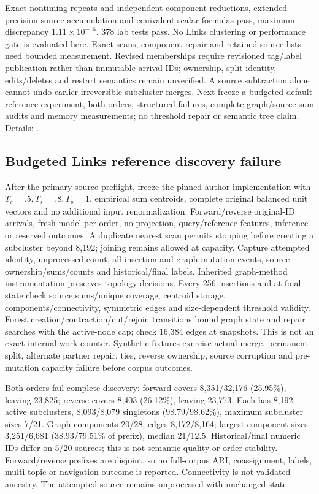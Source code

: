 \documentclass[11pt]{article}
\begin{document}
Exact nontiming repeats and independent component reductions, extended-precision
source accumulation and equivalent scalar formulas pass, maximum discrepancy
$1.11\times10^{-16}$. 378 lab tests pass. No Links clustering or performance
gate is evaluated here. Exact scans, component repair and retained source lists
need bounded measurement. Revised memberships require revisioned tag/label
publication rather than immutable arrival IDs; ownership, split identity,
edits/deletes and restart semantics remain unverified. A source subtraction alone
cannot undo earlier irreversible subcluster merges. Next freeze a budgeted default
reference experiment, both orders, structured failures, complete graph/source-sum
audits and memory measurements; no threshold repair or semantic tree claim.
Details: .

\subsection{Budgeted Links reference discovery failure}
After the primary-source preflight, freeze the pinned author implementation
\cite{mansfield2018links} with $T_c=.5,T_s=.8,T_p=1$, empirical sum centroids,
complete original balanced unit vectors and no additional input renormalization.
Forward/reverse original-ID arrivals, fresh model per order, no projection,
query/reference features, inference or reserved outcomes. A duplicate nearest
scan permits stopping before creating a subcluster beyond 8,192; joining remains
allowed at capacity. Capture attempted identity, unprocessed count, all insertion
and graph mutation events, source ownership/sums/counts and historical/final labels.
Inherited graph-method instrumentation preserves topology decisions. Every 256
insertions and at final state check source sums/unique coverage, centroid storage,
components/connectivity, symmetric edges and size-dependent threshold validity.
Forest creation/contraction/cut/rejoin transitions bound graph state and repair
searches with the active-node cap; check 16,384 edges at snapshots. This is not an
exact internal work counter. Synthetic fixtures exercise actual merge, permanent
split, alternate partner repair, ties, reverse ownership, source corruption and
pre-mutation capacity failure before corpus outcomes.

Both orders fail complete discovery: forward covers 8,351/32,176 (25.95\%),
leaving 23,825; reverse covers 8,403 (26.12\%), leaving 23,773. Each has 8,192
active subclusters, 8,093/8,079 singletons (98.79/98.62\%), maximum subcluster
sizes 7/21. Graph components 20/28, edges 8,172/8,164; largest component
sizes 3,251/6,681 (38.93/79.51\% of prefix), median 21/12.5. Historical/final
numeric IDs differ on 5/20 sources; this is not semantic quality or order stability.
Forward/reverse prefixes are disjoint, so no full-corpus ARI, coassignment,
labels, multi-topic or navigation outcome is reported. Connectivity is not
validated ancestry. The attempted source remains unprocessed with unchanged state.
\end{document}
